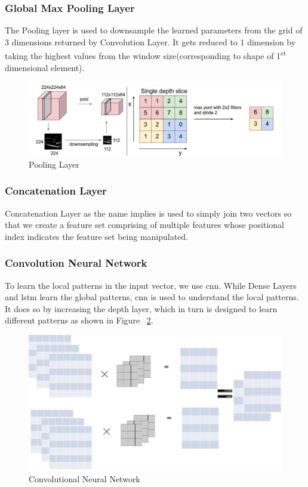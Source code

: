   \subsubsection{Global Max Pooling Layer}
  The Pooling layer is used to downsample the learned parameters from the grid of 3 dimensions returned by Convolution Layer. It gets reduced to 1 dimension by taking the highest values from the window size(corresponding to shape of 1\textsuperscript{st} dimensional element).
  \begin{figure}
    [ht]\centering
    \includegraphics[width=.75\linewidth]{mainmatter/3-Methodology/images/pooling.png}
    \caption{Pooling Layer}
    \label{fig:pool_layer}
  \end{figure}
  
  \subsubsection{Concatenation Layer}
  Concatenation Layer as the name implies is used to simply join two vectors so that we create a feature set comprising of multiple features whose positional index indicates the feature set being manipulated.
  
  \subsubsection{Convolution Neural Network}
  To learn the local patterns in the input vector, we use \acrshort{cnn}. While Dense Layers and \acrshort{lstm} learn the global patterns, \acrshort{cnn} is used to understand the local patterns. It does so by increasing the depth layer, which in turn is designed to learn different patterns as shown in Figure ~\ref{fig:cnn}.
  \begin{figure}[ht]
    \centering
    \includegraphics[width=.5\linewidth]{mainmatter/3-Methodology/images/cnn.png}
    \caption{Convolutional Neural Network}
    \label{fig:cnn}
  \end{figure}
  
